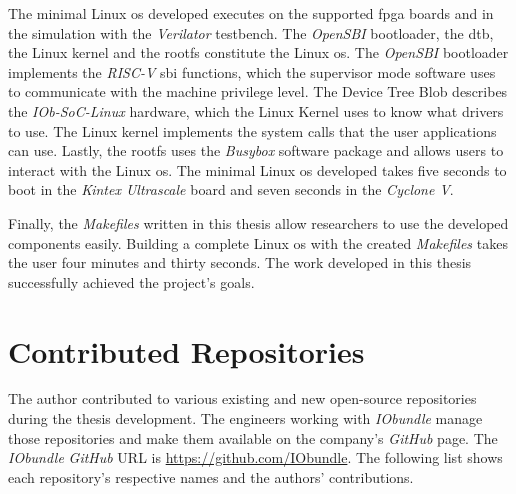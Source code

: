 The minimal Linux \acrshort{os} developed executes on the supported \acrshort{fpga} boards and in the simulation with the \textit{Verilator} testbench. The \textit{OpenSBI} bootloader, the \acrlong{dtb}, the Linux kernel and the \acrlong{rootfs} constitute the Linux \acrshort{os}. The \textit{OpenSBI} bootloader implements the \textit{RISC-V} \acrshort{sbi} functions, which the supervisor mode software uses to communicate with the machine privilege level. The Device Tree Blob describes the \textit{IOb-SoC-Linux} hardware, which the Linux Kernel uses to know what drivers to use. The Linux kernel implements the system calls that the user applications can use. Lastly, the \acrlong{rootfs} uses the \textit{Busybox} software package and allows users to interact with the Linux \acrshort{os}. The minimal Linux \acrshort{os} developed takes five seconds to boot in the \textit{Kintex Ultrascale} board and seven seconds in the \textit{Cyclone V}.

Finally, the \textit{Makefiles} written in this thesis allow researchers to use the developed components easily. Building a complete Linux \acrshort{os} with the created \textit{Makefiles} takes the user four minutes and thirty seconds. The work developed in this thesis successfully achieved the project's goals.

\section{Contributed Repositories}
\label{section:contributions}
The author contributed to various existing and new open-source repositories during the thesis development. The engineers working with \textit{IObundle} manage those repositories and make them available on the company's \textit{GitHub} page. The \textit{IObundle} \textit{GitHub} URL is \url{https://github.com/IObundle}. The following list shows each repository's respective names and the authors' contributions.

